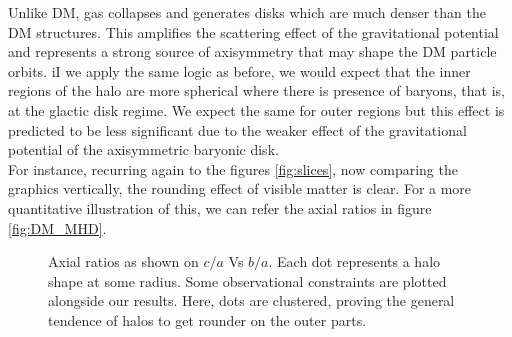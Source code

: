 Unlike DM, gas collapses and generates disks which are much denser than the DM structures. This amplifies the scattering effect of the gravitational potential and represents a strong source of axisymmetry that may shape the DM particle orbits. iI we apply the same logic as before, we would expect that the inner regions of the halo are more spherical where there is presence of baryons, that is, at the glactic disk regime. We expect the same for outer regions but this effect is predicted to be less significant due to the weaker effect of the gravitational potential of the axisymmetric baryonic disk.\\

For instance, recurring again to the figures \ref{fig:slices}, now comparing the graphics vertically, the rounding effect of visible matter is clear. For a more quantitative illustration of this, we can refer the axial ratios in figure \ref{fig:DM_MHD}. \\

\begin{figure}[!ht]
  \centering
  \hfill
  \hfill
  \caption{Axial ratios as shown on $c/a$ Vs $b/a$. Each dot represents a halo shape at some radius. Some observational constraints are plotted alongside our results. Here, dots are clustered, proving the general tendence of halos to get rounder on the outer parts. }
    \label{fig:Triaxiality_DM_MHD}
\end{figure}

